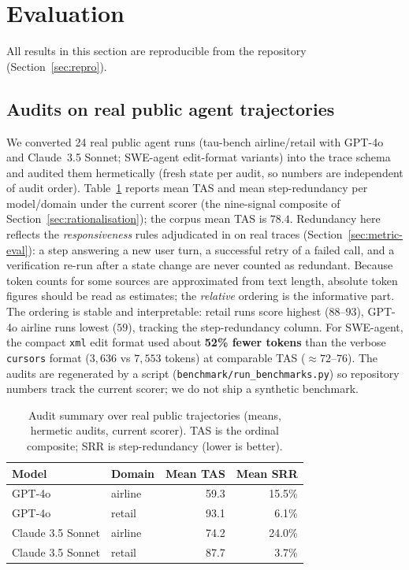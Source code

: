 \documentclass[11pt]{article}
\newcommand{\code}[1]{\texttt{#1}}
\begin{document}
\section{Evaluation}
\label{sec:eval}
All results in this section are reproducible from the repository
(Section~\ref{sec:repro}).

\subsection{Audits on real public agent trajectories}
\label{sec:public-audits}
We converted 24 real public agent runs (tau-bench airline/retail with GPT-4o and
Claude~3.5 Sonnet; SWE-agent edit-format variants) into the trace schema and
audited them hermetically (fresh state per audit, so numbers are independent of
audit order). Table~\ref{tab:taubench} reports mean TAS and mean step-redundancy
per model/domain under the current scorer (the nine-signal composite of
Section~\ref{sec:rationalisation}); the corpus mean TAS is $78.4$.
Redundancy here reflects the \emph{responsiveness} rules adjudicated in on real
traces (Section~\ref{sec:metric-eval}): a step answering a new user turn, a
successful retry of a failed call, and a verification re-run after a state
change are never counted as redundant.
Because token counts for some sources are approximated from text length,
absolute token figures should be read as estimates; the \emph{relative} ordering
is the informative part. The ordering is stable and interpretable: retail runs
score highest ($88$--$93$), GPT-4o airline runs lowest ($59$), tracking the
step-redundancy column. For SWE-agent, the compact \code{xml} edit format used
about \textbf{52\% fewer tokens} than the verbose \code{cursors} format
($3{,}636$ vs $7{,}553$ tokens) at comparable TAS ($\approx 72$--$76$). The
audits are regenerated by a script (\code{benchmark/run\_benchmarks.py}) so
repository numbers track the current scorer; we do not ship a synthetic
benchmark.

\begin{table}[t]
\centering
\caption{Audit summary over real public trajectories (means, hermetic audits,
current scorer). TAS is the ordinal composite; SRR is step-redundancy (lower
is better).}
\label{tab:taubench}
\begin{tabular}{llrr}
\toprule
Model & Domain & Mean TAS & Mean SRR \\
\midrule
GPT-4o          & airline & 59.3 & 15.5\% \\
GPT-4o          & retail  & 93.1 & 6.1\% \\
Claude 3.5 Sonnet & airline & 74.2 & 24.0\% \\
Claude 3.5 Sonnet & retail  & 87.7 & 3.7\% \\
\bottomrule
\end{tabular}
\end{table}
\end{document}
